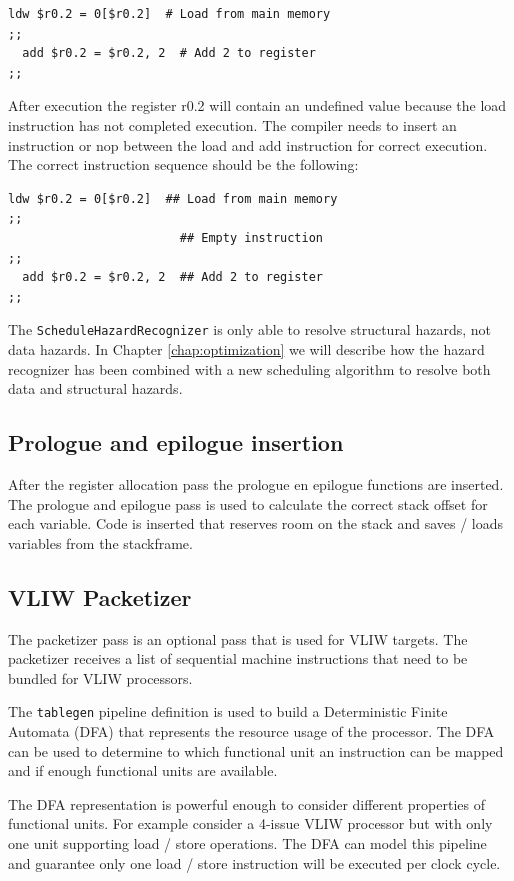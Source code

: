 \begin{lstlisting}[language=rvex]
  ldw $r0.2 = 0[$r0.2]  # Load from main memory
;;
  add $r0.2 = $r0.2, 2  # Add 2 to register
;;
\end{lstlisting}

\newpage

After execution the register r0.2 will contain an undefined value because the load instruction has not completed execution. The compiler needs to insert an instruction or nop between the load and add instruction for correct execution. The correct instruction sequence should be the following:

\begin{lstlisting}[language=rvex]
  ldw $r0.2 = 0[$r0.2]  ## Load from main memory
;;
                        ## Empty instruction
;;
  add $r0.2 = $r0.2, 2  ## Add 2 to register
;;
\end{lstlisting}

The \texttt{ScheduleHazardRecognizer} is only able to resolve structural hazards, not data hazards. In Chapter \ref{chap:optimization} we will describe how the hazard recognizer has been combined with a new scheduling algorithm to resolve both data and structural hazards.

\subsection{Prologue and epilogue insertion}
After the register allocation pass the prologue en epilogue functions are inserted. The prologue and epilogue pass is used to calculate the correct stack offset for each variable. Code is inserted that reserves room on the stack and saves / loads variables from the stackframe.

\subsection{VLIW Packetizer}
The packetizer pass is an optional pass that is used for VLIW targets. The packetizer receives a list of sequential machine instructions that need to be bundled for VLIW processors. 

The \texttt{tablegen} pipeline definition is used to build a Deterministic Finite Automata (DFA) that represents the resource usage of the processor. The DFA can be used to determine to which functional unit an instruction can be mapped and if enough functional units are available.

The DFA representation is powerful enough to consider different properties of functional units. For example consider a 4-issue VLIW processor but with only one unit supporting load / store operations. The DFA can model this pipeline and guarantee only one load / store instruction will be executed per clock cycle.

